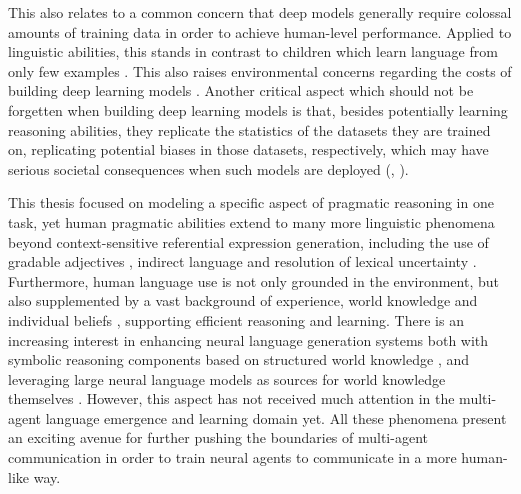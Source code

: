 This also relates to a common concern that deep models generally require colossal amounts of training data in order to achieve human-level performance. Applied to linguistic abilities, this stands in contrast to children which learn language from only few examples \parencite[e.g.,][]{xu2007word}. This also raises environmental concerns regarding the costs of building deep learning models \parencite{bender2021dangers}.  
Another critical aspect which should not be forgetten when building deep learning models is that, besides potentially learning reasoning abilities, they replicate the statistics of the datasets they are trained on, replicating potential biases in those datasets, respectively, which may have serious societal consequences when such models are deployed (\cite{bender2021dangers}, \cite{buolamwini2018gender}). 

This thesis focused on modeling a specific aspect of pragmatic reasoning in one task, yet human pragmatic abilities extend to many more linguistic phenomena beyond context-sensitive referential expression generation, including the use of gradable adjectives \parencite{qing2014gradable}, indirect language \parencite{yoon2016talking} and resolution of lexical uncertainty \parencite{bergen2016pragmatic}.
Furthermore, human language use is not only grounded in the environment, but also supplemented by a vast background of experience, world knowledge and individual beliefs \parencite{lake2017building, franke2016does}, supporting efficient reasoning and learning. There is an increasing interest in enhancing neural language generation systems both with symbolic reasoning components based on structured world knowledge \parencite[e.g.,][]{nye2021improving}, and leveraging large neural language models as sources for world knowledge themselves \parencite{petroni2019language}. However, this aspect has not received much attention in the multi-agent language emergence and learning domain yet. 
All these phenomena present an exciting avenue for further pushing the boundaries of multi-agent communication in order to train neural agents to communicate in a more human-like way. 

